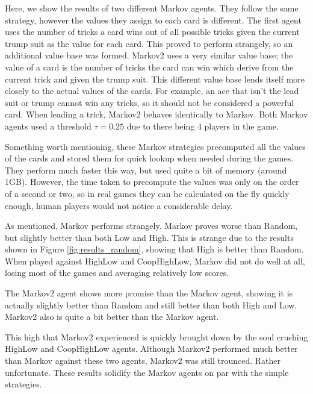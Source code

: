 Here, we show the results of two different Markov agents. They follow the same strategy, however the values they assign to each card
is different. The first agent uses the number of tricks a card wins out of all possible tricks given the current trump suit as the value for
each card. This proved to perform strangely, so an additional value base was formed. Markov2 uses a very similar value base; the value of
a card is the number of tricks the card can win which derive from the current trick and given the trump suit. This different value
base lends itself more closely to the actual values of the cards. For example, an ace that isn't the lead suit or trump cannot win any tricks,
so it should not be considered a powerful card. When leading a trick, Markov2 behaves identically to Markov. Both Markov agents used a threshold
$\tau=0.25$ due to there being 4 players in the game.

Something worth mentioning, these Markov strategies precomputed all the values of the cards and stored them for quick lookup when needed during
the games. They perform much faster this way, but used quite a bit of memory (around 1GB). However, the time taken to precompute the values
was only on the order of a second or two, so in real games they can be calculated on the fly quickly enough, human players would not notice
a considerable delay.

As mentioned, Markov performs strangely. Markov proves worse than Random, but slightly better than both Low and High. This is strange due to
the results shown in Figure \ref{fig:results_random}, showing that High is better than Random. When played against HighLow and CoopHighLow, Markov
did not do well at all, losing most of the games and averaging relatively low scores.

The Markov2 agent shows more promise than the Markov agent, showing it is actually slightly better than Random and still better
than both High and Low. Markov2 also is quite a bit better than the Markov agent.

This high that Markov2 experienced is quickly brought down by the soul crushing HighLow and CoopHighLow agents. Although Markov2
performed much better than Markov against these two agents, Markov2 was still trounced. Rather unfortunate. These results solidify
the Markov agents on par with the simple strategies.

